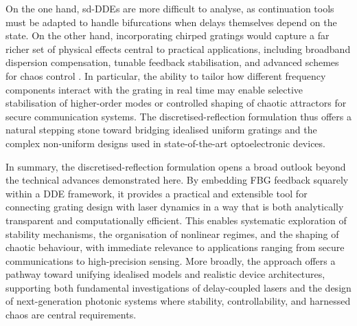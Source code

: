 On the one hand, sd-DDEs are more difficult to analyse, as continuation tools must be adapted to handle bifurcations when delays themselves depend on the state. 
On the other hand, incorporating chirped gratings would capture a far richer set of physical effects central to practical applications, including broadband dispersion compensation, tunable feedback stabilisation, and advanced schemes for chaos control \cite{wang2017time,wang2019key,wang2023critical}. 
In particular, the ability to tailor how different frequency components interact with the grating in real time may enable selective stabilisation of higher-order modes or controlled shaping of chaotic attractors for secure communication systems. 
The discretised-reflection formulation thus offers a natural stepping stone toward bridging idealised uniform gratings and the complex non-uniform designs used in state-of-the-art optoelectronic devices.
%
\par
%
In summary, the discretised-reflection formulation opens a broad outlook beyond the technical advances demonstrated here. 
By embedding FBG feedback squarely within a DDE framework, it provides a practical and extensible tool for connecting grating design with laser dynamics in a way that is both analytically transparent and computationally efficient. 
This enables systematic exploration of stability mechanisms, the organisation of nonlinear regimes, and the shaping of chaotic behaviour, with immediate relevance to applications ranging from secure communications to high-precision sensing. 
More broadly, the approach offers a pathway toward unifying idealised models and realistic device architectures, supporting both fundamental investigations of delay-coupled lasers and the design of next-generation photonic systems where stability, controllability, and harnessed chaos are central requirements.

